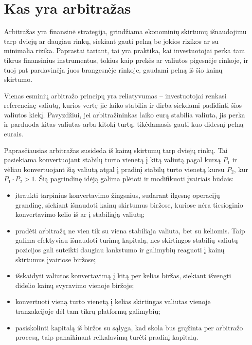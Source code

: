 \documentclass{VUMIFPSkursinis}
\begin{document}
\section{Kas yra arbitražas}
Arbitražas yra finansinė strategija, grindžiama ekonominių skirtumų išnaudojimu tarp dviejų ar daugiau rinkų, siekiant gauti pelną be jokios rizikos ar su minimalia rizika. Paprastai tariant, tai yra praktika, kai investuotojai perka tam tikrus finansinius instrumentus, tokius kaip prekės ar valiutos pigesnėje rinkoje, ir tuoj pat pardavinėja juos brangesnėje rinkoje, gaudami pelną iš šio kainų skirtumo.

Vienas esminių arbitražo principų yra reliatyvumas -- investuotojai renkasi referencinę valiutą, kurios vertę jie laiko stabilia ir dirba siekdami padidinti šios valiutos kiekį. Pavyzdžiui, jei arbitražininkas laiko eurą stabilia valiuta, jis perka ir parduoda kitas valiutas arba kitokį turtą, tikėdamasis gauti kuo didesnį pelną eurais.

Paprasčiausias arbitražas susideda iš kainų skirtumų tarp dviejų rinkų. Tai pasiekiama konvertuojant stabilų turto vienetą į kitą valiutą pagal kursą $P_1$ ir vėliau konvertuojant šią valiutą atgal į pradinį stabilų turto vienetą kursu $P_2$, kur $P_1 \cdot P_2 > 1$. Šią pagrindinę idėją galima plėtoti ir modifikuoti įvairiais būdais:

\begin{itemize}
    \item įtraukti tarpinius konvertavimo žingsnius, sudarant ilgesnę operacijų grandinę, siekiant išnaudoti kainų skirtumus biržose, kuriose nėra tiesioginio konvertavimo kelio iš ar į stabiliąją valiutą;
    \item pradėti arbitražą ne vien tik su viena stabiliąja valiuta, bet su keliomis. Taip galima efektyviau išnaudoti turimą kapitalą, nes skirtingos stabilių valiutų pozicijos gali suteikti daugiau lankstumo ir galimybių reaguoti į kainų skirtumus įvairiose biržose;
    \item išskaidyti valiutos konvertavimą į kitą per kelias biržas, siekiant išvengti didelio kainų svyravimo vienoje biržoje;
    \item konvertuoti vieną turto vienetą į kelias skirtingas valiutas vienoje tranzakcijoje dėl tam tikrų platformų galimybių;
    \item pasiskolinti kapitalą iš biržos su sąlyga, kad skola bus grąžinta per arbitražo procesą, taip panaikinant reikalavimą turėti pradinį kapitalą.
\end{itemize}
\end{document}
